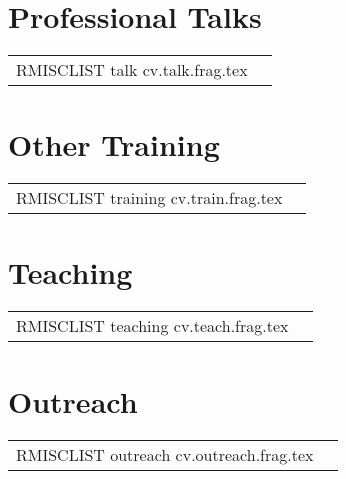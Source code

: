 \documentclass[letterpaper,11pt]{article}
\makeatletter
\newlength{\datewidth} \datewidth=14ex
\newlength{\descwidth} \descwidth=\textwidth
\newenvironment{mytable}{
  \begin{longtable}{@{}p{\datewidth}>{\raggedright}p{\descwidth}}
}{
  \end{longtable}
}
\makeatother
\begin{document}

\section*{Professional Talks}
\begin{mytable}
RMISCLIST talk cv.talk.frag.tex
\end{mytable}


\section*{Other Training}
\begin{mytable}
RMISCLIST training cv.train.frag.tex
\end{mytable}

\section*{Teaching}
\begin{mytable}
RMISCLIST teaching cv.teach.frag.tex
\end{mytable}

\section*{Outreach}
\begin{mytable}
RMISCLIST outreach cv.outreach.frag.tex
\end{mytable}
\end{document}
